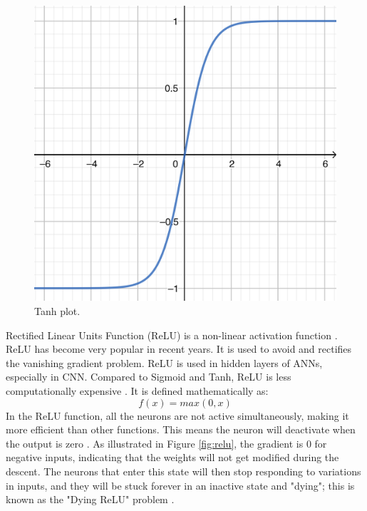 \documentclass[12pt]{diazessay}
\newcounter{subsubsubsection}[subsubsection]
\begin{document}
    \begin{figure}[htp]
        \centering
        \includegraphics[scale=0.18]{Figures/Tanh.jpeg}
        \caption[Hyperbolic Tangent function plot]{Tanh plot.}
        \label{fig:tanh}
    \end{figure}
    \newpage
    
    \hspace{0.7cm} Rectified Linear Units Function (ReLU) is a non-linear activation function \cite{sharma2017activation}. 
    ReLU has become very popular in recent years. It is used to avoid and rectifies the vanishing gradient problem. ReLU is used in hidden layers of ANNs, especially in CNN. Compared to Sigmoid and Tanh, ReLU is less computationally expensive \cite{feng2019performance}. It is defined mathematically as:
    \begin{equation*}
        f(x) = max(0,x)
    \end{equation*}
    \hspace{0.7cm} In the ReLU function, all the neurons are not active simultaneously, making it more efficient than other functions. This means the neuron will deactivate when the output is zero \cite{sharma2017activation}. As illustrated in Figure \ref{fig:relu}, the gradient is 0 for negative inputs, indicating that the weights will not get modified during the descent. The neurons that enter this state will then stop responding to variations in inputs, and they will be stuck forever in an inactive state and "dying"; this is known as the "Dying ReLU" problem \cite{feng2019performance}.
    
\end{document}
